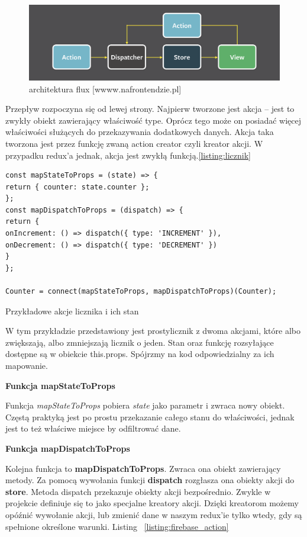\begin{figure}
	\centering\includegraphics[width=.6\textwidth]{img/flux}
	\caption{architektura flux [wwww.nafrontendzie.pl]}\label{rys:flux}%
\end{figure}

Przepływ rozpoczyna się od lewej strony. Najpierw tworzone jest akcja – jest to zwykły obiekt zawierający właściwość type.
Oprócz tego może on posiadać więcej właściwości służących do przekazywania dodatkowych danych.
Akcja taka tworzona jest przez funkcję zwaną action creator czyli kreator akcji.
W przypadku redux'a jednak, akcja jest zwykłą funkcją.\ref{listing:licznik}

\begin{listing}
\begin{verbatim}
const mapStateToProps = (state) => {
return { counter: state.counter };
};
const mapDispatchToProps = (dispatch) => {
return {
onIncrement: () => dispatch({ type: 'INCREMENT' }),
onDecrement: () => dispatch({ type: 'DECREMENT' })
}
};

Counter = connect(mapStateToProps, mapDispatchToProps)(Counter);
\end{verbatim}
\caption{Przykładowe akcje licznika i ich stan} \label{listing:licznik}
\end{listing}

W tym przykładzie przedstawiony jest prostylicznik z dwoma akcjami,
które albo zwiększają, albo zmniejszają licznik o jeden.
Stan oraz funkcję rozsyłające dostępne są w obiekcie this.props. Spójrzmy na kod odpowiedzialny za ich mapowanie.
\begin{center}
	\textbf{Funkcja mapStateToProps}
\end{center}
Funkcja \textit{mapStateToProps} pobiera \textit{state} jako parametr i zwraca nowy obiekt.
Częstą praktyką jest po prostu przekazanie całego stanu do właściwości, jednak jest to też właściwe miejsce by odfiltrować dane. 
\begin{center}
	\textbf{Funkcja mapDispatchToProps}
\end{center}
Kolejna funkcja to \textbf{mapDispatchToProps}. Zwraca ona obiekt zawierający metody.
Za pomocą wywołania funkcji \textbf{dispatch} rozgłasza ona obiekty akcji do \textbf{store}.
Metoda dispatch przekazuje obiekty akcji bezpośrednio.
Zwykle w projekcie definiuje się to jako specjalne kreatory akcji. Dzięki kreatorom możemy opóźnić wywołanie akcji,
lub zmienić dane w naszym redux'ie tylko wtedy, gdy są spełnione określone warunki. Listing 
~\ref{listing:firebase_action}

